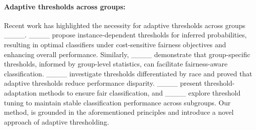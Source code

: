 
\paragraph{Adaptive thresholds across groups:} Recent work has highlighted the necessity for adaptive thresholds across groups ____. ____ propose instance-dependent thresholds for inferred probabilities, resulting in optimal classifiers under cost-sensitive fairness objectives and enhancing overall performance. Similarly, ____ demonstrate that group-specific thresholds, informed by group-level statistics, can facilitate fairness-aware classification. ____ investigate thresholds differentiated by race and proved that adaptive thresholds reduce performance disparity. ____ present threshold-adaptation methods to ensure fair classification, and ____ explore threshold tuning to maintain stable classification performance across subgroups. Our method, \textit{\name} is grounded in the aforementioned principles and introduce a novel approach of adaptive thresholding.




%